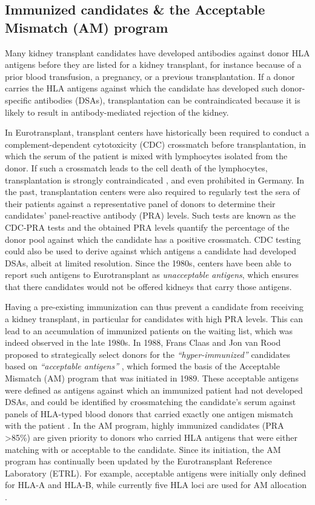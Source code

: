 \documentclass[11pt,twoside,]{book}
\begin{document}
\subsection{Immunized candidates \& the Acceptable Mismatch (AM) program}\label{sec:introam}

Many kidney transplant candidates have developed
antibodies against donor HLA antigens before they are listed for a kidney transplant,
for instance because of a prior blood transfusion, a pregnancy,
or a previous transplantation. If a donor carries the HLA antigens against which the candidate
has developed such donor-specific antibodies (DSAs), transplantation can be
contraindicated because it is likely to result in antibody-mediated rejection
of the kidney.

In Eurotransplant, transplant centers have historically been required to conduct
a complement-dependent cytotoxicity (CDC) crossmatch before transplantation,
in which the serum of the patient is mixed with lymphocytes isolated from the donor. If such a crossmatch
leads to the cell death of the lymphocytes, transplantation is strongly contraindicated
\citep{patelSignificancePositiveCrossmatch1969}, and even prohibited in Germany.
In the past, transplantation
centers were also required to regularly test the sera of their patients against
a representative panel of donors to determine their candidates' panel-reactive antibody (PRA) levels.
Such tests are known as the CDC-PRA tests and the obtained PRA levels quantify
the percentage of the donor pool against which the candidate has a positive
crossmatch. CDC testing could also be used to derive
against which antigens a candidate had developed DSAs, albeit at limited resolution.
Since the 1980s, centers have been able to report such antigens to Eurotransplant
as \emph{unacceptable antigens},
which ensures that there candidates would not be offered kidneys that carry those
antigens.

Having a pre-existing immunization can thus prevent a candidate from receiving a
kidney transplant, in particular for candidates with high PRA levels.
This can lead to an accumulation of immunized patients on the waiting list, which
was indeed observed in the late 1980s. In 1988, Frans Claas and Jon van Rood proposed to
strategically select donors for the \emph{``hyper-immunized''} candidates based on \emph{``acceptable antigens''}
\citep{Claas1988}, which formed the basis of the Acceptable Mismatch (AM) program that
was initiated in 1989. These acceptable antigens were defined as antigens against which
an immunized patient had not developed DSAs, and could be identified by crossmatching the candidate's
serum against panels of HLA-typed blood donors that carried exactly one antigen
mismatch with the patient \citep{Claas1988, Heidt2015}. In the
AM program, highly immunized candidates (PRA \textgreater85\%) are given priority
to donors who carried HLA antigens that were either matching with or acceptable to the
candidate. Since its initiation, the AM program has continually been updated by
the Eurotransplant Reference Laboratory (ETRL). For example,
acceptable antigens were initially only defined for HLA-A and HLA-B, while currently
five HLA loci are used for AM allocation \citep{ETHist2025}.
\end{document}

